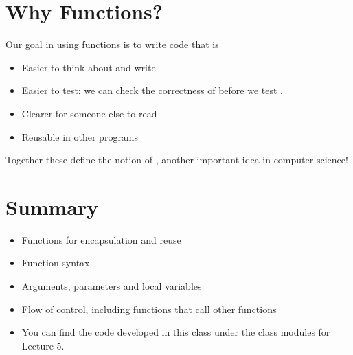 \documentclass[letterpaper,10pt,english]{sphinxmanual}
\begin{document}
\section{Why Functions?}
\label{\detokenize{lecture_notes/lec05_functions2:id1}}
Our goal in using functions is to write code that is
\begin{itemize}
\item {} 
Easier to think about and write

\item {} 
Easier to test: we can check the correctness of 
before we test .

\item {} 
Clearer for someone else to read

\item {} 
Reusable in other programs

\end{itemize}

Together these define the notion of , another important
idea in computer science!


\section{Summary}
\label{\detokenize{lecture_notes/lec05_functions2:summary}}\begin{itemize}
\item {} 
Functions for encapsulation and reuse

\item {} 
Function syntax

\item {} 
Arguments, parameters and local variables

\item {} 
Flow of control, including functions that call other functions

\item {} 
You can find the code developed in this class under the class
modules for Lecture 5.

\end{itemize}
\end{document}
